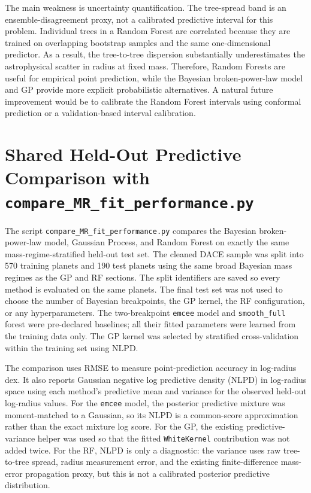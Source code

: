 \documentclass{article}
\numberwithin{equation}{section}
\begin{document}
The main weakness is uncertainty quantification. The tree-spread band is an ensemble-disagreement proxy, not a calibrated predictive interval for this problem. Individual trees in a Random Forest are correlated because they are trained on overlapping bootstrap samples and the same one-dimensional predictor. As a result, the tree-to-tree dispersion substantially underestimates the astrophysical scatter in radius at fixed mass. Therefore, Random Forests are useful for empirical point prediction, while the Bayesian broken-power-law model and GP provide more explicit probabilistic alternatives. A natural future improvement would be to calibrate the Random Forest intervals using conformal prediction or a validation-based interval calibration.

\section{Shared Held-Out Predictive Comparison with \texttt{compare\_MR\_fit\_performance.py}}

The script \texttt{compare\_MR\_fit\_performance.py} compares the Bayesian broken-power-law model, Gaussian Process, and Random Forest on exactly the same mass-regime-stratified held-out test set. The cleaned DACE sample was split into 570 training planets and 190 test planets using the same broad Bayesian mass regimes as the GP and RF sections. The split identifiers are saved so every method is evaluated on the same planets. The final test set was not used to choose the number of Bayesian breakpoints, the GP kernel, the RF configuration, or any hyperparameters. The two-breakpoint \texttt{emcee} model and \texttt{smooth\_full} forest were pre-declared baselines; all their fitted parameters were learned from the training data only. The GP kernel was selected by stratified cross-validation within the training set using NLPD.

The comparison uses RMSE to measure point-prediction accuracy in log-radius dex. It also reports Gaussian negative log predictive density (NLPD) in log-radius space using each method's predictive mean and variance for the observed held-out log-radius values. For the \texttt{emcee} model, the posterior predictive mixture was moment-matched to a Gaussian, so its NLPD is a common-score approximation rather than the exact mixture log score. For the GP, the existing predictive-variance helper was used so that the fitted \texttt{WhiteKernel} contribution was not added twice. For the RF, NLPD is only a diagnostic: the variance uses raw tree-to-tree spread, radius measurement error, and the existing finite-difference mass-error propagation proxy, but this is not a calibrated posterior predictive distribution.
\end{document}
